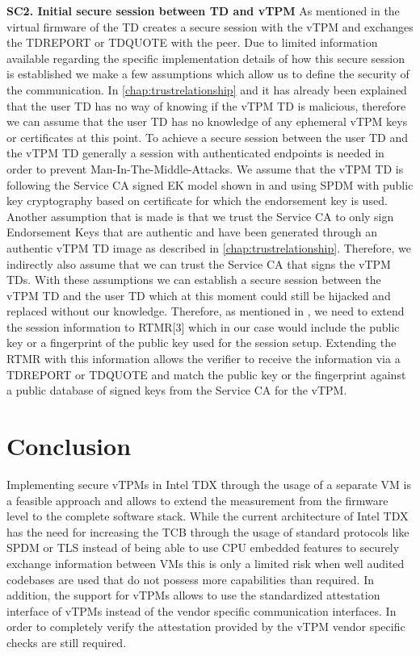 \documentclass[sigplan,screen,nonacm]{acmart}
\begin{document}
\textbf{SC2. Initial secure session between TD and vTPM}
As mentioned in \cite[p. 7]{Intel-vTPM} the virtual firmware of the TD creates a secure session with the vTPM and exchanges the TDREPORT or TDQUOTE with the peer.
Due to limited information available regarding the specific implementation details of how this secure session is established we make a few assumptions which allow us to define the security of the communication.
In \cref{chap:trustrelationship} and \cite[p. 9]{Intel-vTPM} it has already been explained that the user TD has no way of knowing if the vTPM TD is malicious, therefore we can assume that the user TD has no knowledge of any ephemeral vTPM keys or certificates at this point.
To achieve a secure session between the user TD and the vTPM TD generally a session with authenticated endpoints is needed in order to prevent Man-In-The-Middle-Attacks.
We assume that the vTPM TD is following the Service CA signed EK model shown in \cite[p. 15]{Intel-vTPM} and using SPDM with public key cryptography based on certificate for which the endorsement key is used\cite[p. 70]{SPDM}.
Another assumption that is made is that we trust the Service CA to only sign Endorsement Keys that are authentic and have been generated through an authentic vTPM TD image as described in \cref{chap:trustrelationship}.
Therefore, we indirectly also assume that we can trust the Service CA that signs the vTPM TDs.
With these assumptions we can establish a secure session between the vTPM TD and the user TD which at this moment could still be hijacked and replaced without our knowledge.
Therefore, as mentioned in \cite[p. 7]{Intel-vTPM}, we need to extend the session information to RTMR[3] which in our case would include the public key or a fingerprint of the public key used for the session setup.
Extending the RTMR with this information allows the verifier to receive the information via a TDREPORT or TDQUOTE and match the public key or the fingerprint against a public database of signed keys from the Service CA for the vTPM.

\section{Conclusion}
Implementing secure vTPMs in Intel TDX through the usage of a separate VM is a feasible approach and allows to extend the measurement from the firmware level to the complete software stack.
While the current architecture of Intel TDX has the need for increasing the TCB through the usage of standard protocols like SPDM or TLS instead of being able to use CPU embedded features to securely exchange information between VMs this is only a limited risk when well audited codebases are used that do not possess more capabilities than required.
In addition, the support for vTPMs allows to use the standardized attestation interface of vTPMs instead of the vendor specific communication interfaces.
In order to completely verify the attestation provided by the vTPM vendor specific checks are still required.



\end{document}
